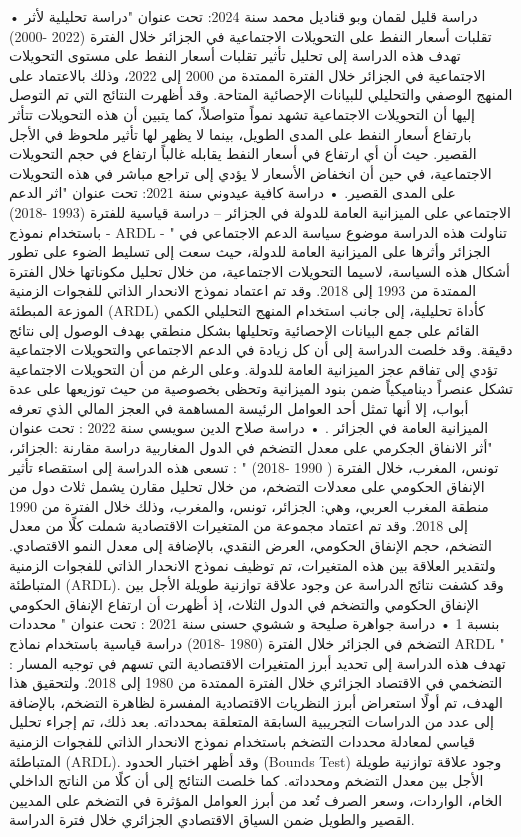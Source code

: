\documentclass[12pt,a4paper]{report}
\begin{document}
• دراسة قليل لقمان وبو قناديل محمد سنة 2024: تحت عنوان "دراسة تحليلية لأثر تقلبات أسعار النفط على التحويلات الاجتماعية في الجزائر خلال الفترة (2022 -2000) تهدف هذه الدراسة إلى تحليل تأثير تقلبات أسعار النفط على مستوى التحويلات الاجتماعية في الجزائر خلال الفترة الممتدة من 2000 إلى 2022، وذلك بالاعتماد على المنهج الوصفي والتحليلي للبيانات الإحصائية المتاحة. وقد أظهرت النتائج التي تم التوصل إليها أن التحويلات الاجتماعية تشهد نمواً متواصلاً، كما يتبين أن هذه التحويلات تتأثر بارتفاع أسعار النفط على المدى الطويل، بينما لا يظهر لها تأثير ملحوظ في الأجل القصير. حيث أن أي ارتفاع في أسعار النفط يقابله غالباً ارتفاع في حجم التحويلات الاجتماعية، في حين أن انخفاض الأسعار لا يؤدي إلى تراجع مباشر في هذه التحويلات على المدى القصير.
• دراسة كافية عيدوني سنة 2021: تحت عنوان "اثر الدعم الاجتماعي على الميزانية العامة للدولة في الجزائر – دراسة قياسية للفترة (1993 -2018) باستخدام نموذج - ARDL - " تناولت هذه الدراسة موضوع سياسة الدعم الاجتماعي في الجزائر وأثرها على الميزانية العامة للدولة، حيث سعت إلى تسليط الضوء على تطور أشكال هذه السياسة، لاسيما التحويلات الاجتماعية، من خلال تحليل مكوناتها خلال الفترة الممتدة من 1993 إلى 2018. وقد تم اعتماد نموذج الانحدار الذاتي للفجوات الزمنية الموزعة المبطئة (ARDL) كأداة تحليلية، إلى جانب استخدام المنهج التحليلي الكمي القائم على جمع البيانات الإحصائية وتحليلها بشكل منطقي بهدف الوصول إلى نتائج دقيقة. وقد خلصت الدراسة إلى أن كل زيادة في الدعم الاجتماعي والتحويلات الاجتماعية تؤدي إلى تفاقم عجز الميزانية العامة للدولة. وعلى الرغم من أن التحويلات الاجتماعية تشكل عنصراً ديناميكياً ضمن بنود الميزانية وتحظى بخصوصية من حيث توزيعها على عدة أبواب، إلا أنها تمثل أحد العوامل الرئيسة المساهمة في العجز المالي الذي تعرفه الميزانية العامة في الجزائر . 
•  دراسة صلاح الدين سويسي سنة 2022 : تحت عنوان "أثر الانفاق الجكرمي على معدل التضخم في الدول المغاربية دراسة مقارنة :الجزائر، تونس، المغرب، خلال الفترة ( 1990 -2018) " : تسعى هذه الدراسة إلى استقصاء تأثير الإنفاق الحكومي على معدلات التضخم، من خلال تحليل مقارن يشمل ثلاث دول من منطقة المغرب العربي، وهي: الجزائر، تونس، والمغرب، وذلك خلال الفترة من 1990 إلى 2018. وقد تم اعتماد مجموعة من المتغيرات الاقتصادية شملت كلًا من معدل التضخم، حجم الإنفاق الحكومي، العرض النقدي، بالإضافة إلى معدل النمو الاقتصادي. ولتقدير العلاقة بين هذه المتغيرات، تم توظيف نموذج الانحدار الذاتي للفجوات الزمنية المتباطئة (ARDL). وقد كشفت نتائج الدراسة عن وجود علاقة توازنية طويلة الأجل بين الإنفاق الحكومي والتضخم في الدول الثلاث، إذ أظهرت أن ارتفاع الإنفاق الحكومي بنسبة 1%
• دراسة جواهرة صليحة و ششوي حسنى سنة 2021 : تحت عنوان " محددات التضخم في الجزائر خلال الفترة (1980 -2018) دراسة قياسية باستخدام نماذج ARDL " : تهدف هذه الدراسة إلى تحديد أبرز المتغيرات الاقتصادية التي تسهم في توجيه المسار التضخمي في الاقتصاد الجزائري خلال الفترة الممتدة من 1980 إلى 2018. ولتحقيق هذا الهدف، تم أولًا استعراض أبرز النظريات الاقتصادية المفسرة لظاهرة التضخم، بالإضافة إلى عدد من الدراسات التجريبية السابقة المتعلقة بمحدداته. بعد ذلك، تم إجراء تحليل قياسي لمعادلة محددات التضخم باستخدام نموذج الانحدار الذاتي للفجوات الزمنية المتباطئة (ARDL). وقد أظهر اختبار الحدود (Bounds Test) وجود علاقة توازنية طويلة الأجل بين معدل التضخم ومحدداته. كما خلصت النتائج إلى أن كلًا من الناتج الداخلي الخام، الواردات، وسعر الصرف تُعد من أبرز العوامل المؤثرة في التضخم على المديين القصير والطويل ضمن السياق الاقتصادي الجزائري خلال فترة الدراسة.
\end{document}
